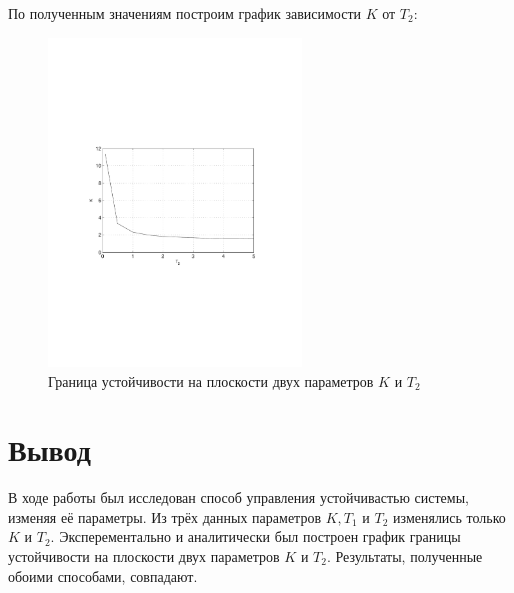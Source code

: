 \documentclass[a4paper, 11pt, russian]{article}
\begin{document}
    По полученным значениям построим график зависимости $K$ от $T_2$:
    \begin{figure}[h!]
        \centering
        \includegraphics[width = 0.6\textwidth]{KT2graph}
        \caption{Граница устойчивости на плоскости двух параметров $K$ и $T_2$}
    \end{figure}
    \clearpage
    \section{Вывод}
    В ходе работы был исследован способ управления устойчивастью системы, изменяя её параметры. Из трёх данных параметров $K, T_1$ и $T_2$ изменялись только $K$ и $T_2$. Эксперементально и аналитически был построен график границы устойчивости на плоскости двух параметров $K$ и $T_2$. Результаты, полученные обоими способами, совпадают.
\end{document}
